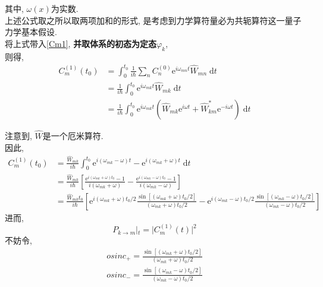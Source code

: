 \documentclass[a4paper, 11pt]{article}
\begin{document}
\begin{spacing}{1.2}
        其中, $\omega(x)$为实数.\\
        上述公式取之所以取两项加和的形式, 是考虑到力学算符量必为共轭算符这一量子力学基本假设.\\
        将上式带入\eqref{Cm1}, \textbf{并取体系的初态为定态$\varphi_k$},\\
        则得,
        \begin{equation}
          \begin{aligned} 
            C_m^{(1)}(t_0) & = \int_0^{t_0}\frac{1}{i\hbar}\sum_n C_n^{(0)}
            \mathrm{e}^{i\omega_{mn}t} \hat{W}_{mn} \; \mathrm{d}t \\
            & = \frac{1}{i\hbar}\int_0^{t_0}
            \mathrm{e}^{i\omega_{mk}t} \hat{W}_{mk}\; \mathrm{d}t \\ 
            & = \frac{1}{i\hbar}\int_0^{t_0}
            \mathrm{e}^{i\omega_{mk}t} 
            (\hat{W}_{mk}\mathrm{e}^{i\omega{}t}+\hat{W}^*_{km}\mathrm{e}^{-i\omega{}t})
            \; \mathrm{d}t
          \end{aligned}
        \end{equation}

        \noindent
        注意到, $\hat{W}$是一个厄米算符. \\
        因此,
        \begin{equation}
          \label{Cm1_simplize}
          \begin{aligned} 
            C_m^{(1)}(t_0) & = \frac{\hat{W}_{mk}}{i\hbar}\int_0^{t_0}
            \mathrm{e}^{i(\omega_{mk}-\omega)t} - \mathrm{e}^{i(\omega_{mk}+\omega)t}
             \; \mathrm{d}t \\
             & = \frac{\hat{W}_{mk}}{i\hbar}
             \left[
             \frac{\mathrm{e}^{i(\omega_{mk}+\omega)t_0}-1}{i(\omega_{mk}+\omega)} 
             -\frac{\mathrm{e}^{i(\omega_{mk}-\omega)t_0}-1}{i(\omega_{mk}-\omega)}
              \right]\\
              & = \frac{\hat{W}_{mk}t_0}{i\hbar}
              \left[
              \mathrm{e}^{i(\omega_{mk}+\omega)t_0/2}
              \frac{\sin[(\omega_{mk}+\omega)t_0/2]}{(\omega_{mk}+\omega)t_0/2} 
               - \mathrm{e}^{i(\omega_{mk}-\omega)t_0/2}
              \frac{\sin[(\omega_{mk}-\omega)t_0/2]}{(\omega_{mk}-\omega)t_0/2} 
               \right]
          \end{aligned}
        \end{equation}
        进而, 
        \begin{equation} 
            P_{k\to m}|_{t} = |C_m^{(1)}(t)|^2
        \end{equation}
        不妨令,
        \begin{subequations}
          \begin{align}
            osinc_+ =  \frac{\sin[(\omega_{mk}+\omega)t_0/2]}{(\omega_{mk}+\omega)t_0/2}\\
            osinc_- =  \frac{\sin[(\omega_{mk}-\omega)t_0/2]}{(\omega_{mk}-\omega)t_0/2}
          \end{align}
        \end{subequations}
        

\end{spacing}
\end{document}
